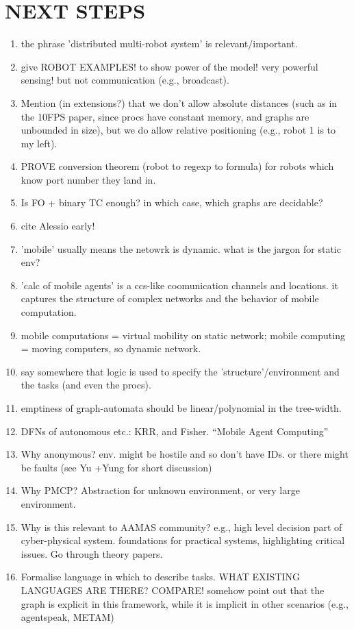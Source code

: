 
\section{NEXT STEPS}
\begin{enumerate}
\item the phrase  'distributed multi-robot system' is relevant/important.
\item give ROBOT EXAMPLES! to show power of the model! very powerful sensing!
but not communication (e.g., broadcast).
\item Mention (in extensions?) that we don't allow absolute distances (such as
in the 10FPS paper, since procs have constant memory, and graphs are unbounded
in size), but we do allow relative positioning (e.g., robot 1 is to my left).
\item PROVE conversion theorem (robot to regexp to formula) for robots which
know port number they land in.
\item Is FO + binary TC enough? in which case, which graphs are decidable?
\item cite Alessio early!
\item 'mobile' usually means the netowrk is dynamic. what is the jargon for
static env?
\item 'calc of mobile agents' is a ccs-like coomunication channels and
locations. it captures the structure of complex networks and the behavior of
mobile computation.
\item mobile computations  = virtual mobility on static network; mobile
computing = moving computers, so dynamic network.
\item say somewhere that logic is used to specify the 'structure'/environment
and the tasks (and even the procs).
\item emptiness of graph-automata should be linear/polynomial in the tree-width.
\item DFNs of autonomous etc.: KRR, and Fisher. ``Mobile Agent Computing''
\item Why anonymous? env. might be hostile and so don't have IDs. or there might
be faults (see Yu +Yung for short  discussion)
\item Why PMCP? Abstraction for unknown environment, or very large environment.
\item Why is this relevant to AAMAS community? e.g., high level decision part of
cyber-physical system. foundations for practical systems, highlighting critical
issues. Go through theory papers.
\item Formalise language in which to describe tasks. WHAT EXISTING LANGUAGES ARE
THERE? COMPARE! somehow point out that the graph is explicit in this framework,
while it is implicit in other scenarios (e.g., agentspeak, METAM)


\end{enumerate}
